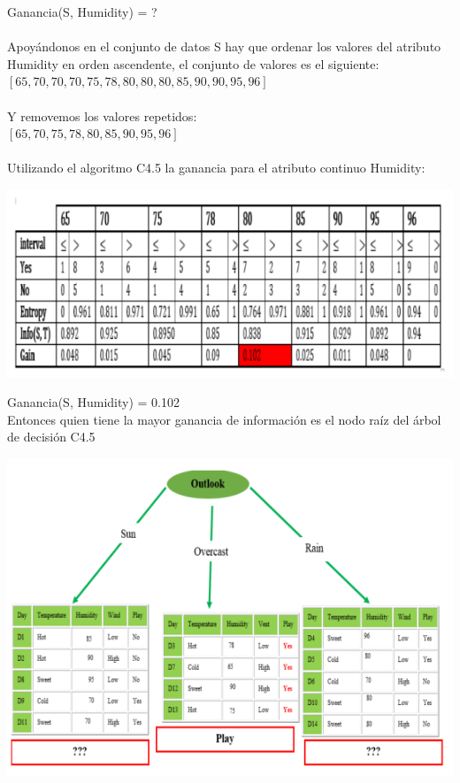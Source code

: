 \documentclass{article}
\begin{document}
Ganancia(S, Humidity) = ?\\\\
Apoyándonos en el conjunto de datos S  hay que ordenar los valores del atributo Humidity en orden ascendente, el conjunto de valores es el siguiente:\\
$[65, 70, 70, 70, 75, 78, 80, 80, 80, 85, 90, 90, 95, 96]$\\\\
Y removemos los valores repetidos:\\
$[65, 70, 75, 78, 80, 85, 90, 95, 96]$\\\\
Utilizando el algoritmo C4.5 la ganancia para el atributo continuo Humidity:\\
\begin{center}
 \includegraphics[scale=0.7]{c45}\\
\end{center}
Ganancia(S, Humidity) = 0.102\\

Entonces quien tiene la mayor ganancia de información es el nodo raíz del árbol de decisión C4.5

\begin{center}
 \includegraphics[scale=0.7]{arbol}\\
\end{center}
\end{document}
